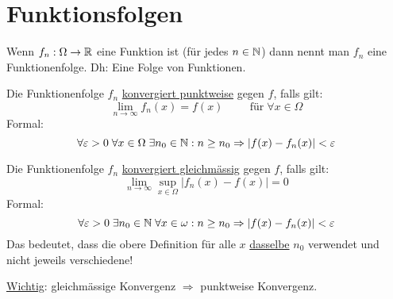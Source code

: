 \section{Funktionsfolgen}
Wenn $f_n : \Omega \to \mathbb{R}$ eine Funktion ist (für jedes $n \in \mathbb{N}$) dann nennt man $f_n$ eine Funktionenfolge. Dh: Eine Folge von Funktionen.

\begin{definition} 
Die Funktionenfolge $f_n$ \underline{konvergiert punktweise} gegen $f$, falls gilt:
\[
	\lim_{n \to \infty} f_n(x) = f(x) \hspace{1cm} \text{für} \; \forall x \in \Omega
\]
Formal: 
\[
\forall \varepsilon > 0 \; \forall x \in \Omega \; \exists n_0 \in \mathbb{N}: n \geq n_0
\Rightarrow |f(x) - f_n(x)| < \varepsilon
\]
\end{definition}


\begin{definition} 
Die Funktionenfolge $f_n$ \underline{konvergiert gleichmässig} gegen $f$, falls gilt:
\[
	\lim_{n \to \infty} \sup_{x \in \Omega} |f_n(x) - f(x)| = 0 
\]
Formal: 
\[
\forall \varepsilon > 0 \; \exists n_0 \in \mathbb{N} \; \forall x \in \omega: n \geq n_0
\Rightarrow |f(x) - f_n(x)| < \varepsilon
\]
Das bedeutet, dass die obere Definition für alle $x$ \underline{dasselbe} $n_0$ verwendet und nicht jeweils
verschiedene!
\end{definition}

\underline{Wichtig}: gleichmässige Konvergenz $\Rightarrow$ punktweise
Konvergenz.